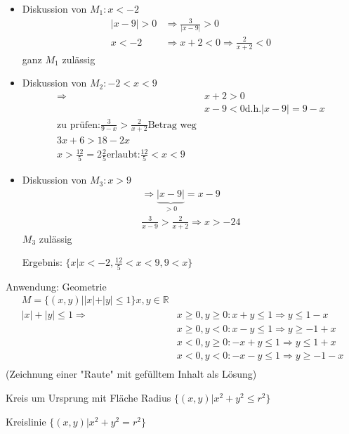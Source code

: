 \begin{itemize}
 \item Diskussion von $M_1: x < -2$
\begin{align*}
|x-9|>0 &\Rightarrow \frac{3}{|x-9|} > 0 \\
x<-2 &\Rightarrow x+2<0 \Rightarrow \frac{2}{x+2}<0
\end{align*}
ganz $M_1$ zulässig
 \item Diskussion von $M_2: -2<x<9$
\begin{align*}
\Rightarrow &x+2 > 0 \\
&x-9<0 \textrm{d.h.} |x-9|=9-x \\
\textrm{zu prüfen:}
\frac{3}{9-x} > \frac{2}{x+2} \textrm{Betrag weg} \\
3x+6 > 18-2x \\
x > \frac{12}{5} = 2 \frac{2}{5}
\textrm{erlaubt:} \frac{12}{5}<x<9
\end{align*}
 \item Diskussion von $M_3: x>9$
\begin{align*}
 \Rightarrow \underbrace{|x-9|}_{>0} = x-9 \\
\frac{3}{x-9} > \frac{2}{x+2}
\Rightarrow x>-24
\end{align*}
$M_3$ zulässig

Ergebnis: $\{x|x<-2, \frac{12}{5}<x<9, 9<x\}$
\end{itemize}

Anwendung: Geometrie
\begin{align*}
M = \{(x,y)| |x|+|y| \leq 1 \} x,y \in \mathbb{R} \\
|x|+|y| \leq 1 \Rightarrow &x \geq 0, y \geq 0: x+y \leq 1 \Rightarrow y \leq 1-x \\
	&x \geq 0, y < 0: x-y \leq 1 \Rightarrow y \geq -1+x \\
	&x < 0, y \geq 0: -x+y \leq 1 \Rightarrow y \leq 1+x \\
	&x < 0, y < 0: -x-y \leq 1 \Rightarrow y \geq -1-x \\
\end{align*}
(Zeichnung einer "Raute" mit gefülltem Inhalt als Lösung)

Kreis um Ursprung mit Fläche
Radius $\{(x,y)| x^2+y^2\leq r^2 \}$

Kreislinie $\{(x,y)| x^2+y^2 = r^2 \}$
